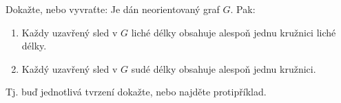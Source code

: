 \documentclass[11pt,a4paper]{article}
\begin{document}
\title{}
\author{Jakub Adamec\\XP01TGR}

\maketitle

\begin{exercise}
Dokažte, nebo vyvraťte: Je dán neorientovaný graf $G$. Pak:
\vspace{-1em}
\begin{enumerate}[noitemsep]
    \item Každy uzavřený sled v $G$ liché délky obsahuje alespoň jednu kružnici liché délky.
    \item Každý uzavřený sled v $G$ sudé délky obsahuje alespoň jednu kružnici.
\end{enumerate}
\vspace{-1em}
Tj. buď jednotlivá tvrzení dokažte, nebo najděte protipříklad.
\end{exercise}
\end{document}
